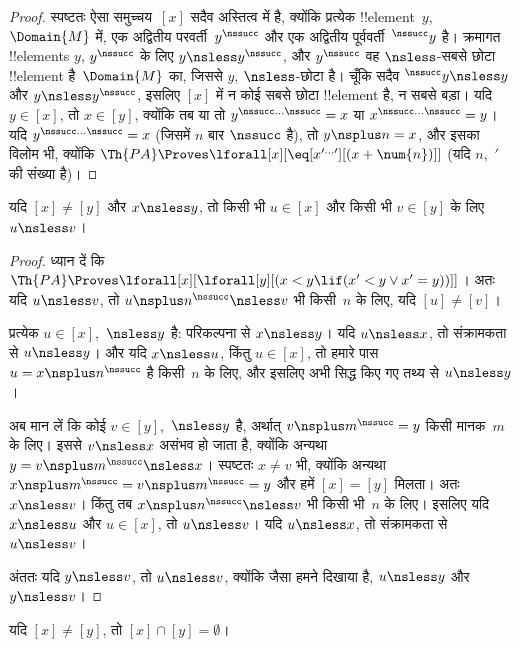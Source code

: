 \documentclass[../../../include/open-logic-section]{subfiles}
\begin{document}
\begin{proof}
स्पष्टतः ऐसा समुच्चय~$[x]$ सदैव अस्तित्व में है, क्योंकि प्रत्येक
!!{element}~$y$,~$\Domain{M}$ में, एक अद्वितीय परवर्ती~$y^\nssucc$ और एक अद्वितीय
पूर्ववर्ती~$^\nssucc y$ है। क्रमागत !!{element}s $y$, $y^\nssucc$ के लिए
$y \nsless y^\nssucc$, और $y^\nssucc$ वह $\nsless$-सबसे छोटा
!!{element} है~$\Domain{M}$ का, जिससे $y$, $\nsless$-छोटा है। चूँकि
सदैव $^\nssucc y \nsless y$ और $y \nsless y^\nssucc$, इसलिए $[x]$ में
न कोई सबसे छोटा !!{element} है, न सबसे बड़ा। यदि $y \in [x]$, तो
$x \in [y]$, क्योंकि तब या तो $y^{\nssucc\dots\nssucc} = x$ या
$x^{\nssucc\dots\nssucc} = y$। यदि $y^{\nssucc\dots\nssucc} = x$
(जिसमें $n$ बार $\nssucc$ है), तो $y \nsplus n = x$, और इसका विलोम भी,
क्योंकि $\Th{PA} \Proves \lforall[x][\eq[x^{\prime\dots\prime}][(x +
    \num{n})]]$ (यदि $n$,~$\prime$ की संख्या है)।
\end{proof}

\begin{prop}
यदि $[x] \neq [y]$ और $x \nsless y$, तो किसी भी $u \in [x]$ और किसी भी
$v \in [y]$ के लिए $u \nsless v$।
\end{prop}

\begin{proof}
ध्यान दें कि $\Th{PA} \Proves \lforall[x][\lforall[y][(x < y \lif (x' < y
    \lor x' = y))]]$। अतः यदि $u \nsless v$, तो
$u \nsplus
n^\nssucc \nsless v$ भी किसी~$n$ के लिए, यदि $[u] \neq [v]$।

प्रत्येक $u \in [x]$,~$\nsless y$ है: परिकल्पना से $x \nsless y$। यदि $u
\nsless x$, तो संक्रामकता से $u \nsless y$। और यदि $x \nsless u$, किंतु
$u
\in [x]$, तो हमारे पास $u = x\nsplus n^\nssucc$ है किसी~$n$ के लिए, और
इसलिए अभी सिद्ध किए गए तथ्य से $u
\nsless y$।

अब मान लें कि कोई $v \in [y]$,~$\nsless y$ है, अर्थात्
$v \nsplus
m^\nssucc = y$ किसी मानक~$m$ के लिए। इससे $v \nsless x$ असंभव हो जाता है,
क्योंकि अन्यथा $y = v \nsplus m^\nssucc \nsless x$। स्पष्टतः
$x \neq
v$ भी, क्योंकि अन्यथा
$x \nsplus m^\nssucc = v \nsplus m^\nssucc = y$ और हमें
$[x] = [y]$ मिलता। अतः $x \nsless v$। किंतु तब
$x \nsplus
n^\nssucc \nsless v$ भी किसी भी~$n$ के लिए। इसलिए यदि $x \nsless u$ और
$u \in
[x]$, तो $u \nsless v$। यदि $u \nsless x$, तो संक्रामकता से
$u \nsless v$।

अंततः यदि $y \nsless v$, तो $u \nsless v$, क्योंकि जैसा हमने दिखाया है, $u
\nsless y$ और $y \nsless v$।
\end{proof}

\begin{cor}
यदि $[x] \neq [y]$, तो $[x] \cap [y] = \emptyset$।
\end{cor}
\end{document}
